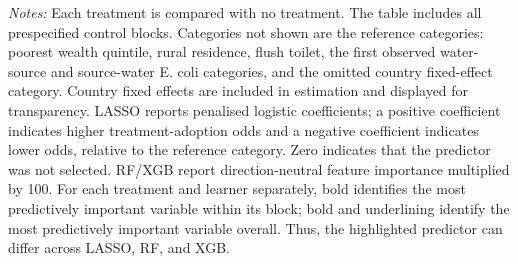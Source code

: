 \begin{landscape}
\begin{table}[p]
\begin{minipage}{\linewidth}\footnotesize \textit{Notes:} Each treatment is compared with no treatment. The table includes all prespecified control blocks. Categories not shown are the reference categories: poorest wealth quintile, rural residence, flush toilet, the first observed water-source and source-water E. coli categories, and the omitted country fixed-effect category. Country fixed effects are included in estimation and displayed for transparency. LASSO reports penalised logistic coefficients; a positive coefficient indicates higher treatment-adoption odds and a negative coefficient indicates lower odds, relative to the reference category. Zero indicates that the predictor was not selected. RF/XGB report direction-neutral feature importance multiplied by 100. For each treatment and learner separately, bold identifies the most predictively important variable within its block; bold and underlining identify the most predictively important variable overall. Thus, the highlighted predictor can differ across LASSO, RF, and XGB.\end{minipage}
\end{table}
\end{landscape}
